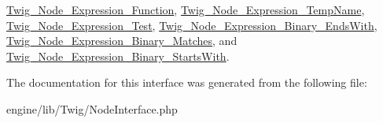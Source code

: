 \hyperlink{class_twig___node___expression___function_a4e0faa87c3fae583620b84d3607085da}{Twig\+\_\+\+Node\+\_\+\+Expression\+\_\+\+Function}, \hyperlink{class_twig___node___expression___temp_name_a4e0faa87c3fae583620b84d3607085da}{Twig\+\_\+\+Node\+\_\+\+Expression\+\_\+\+Temp\+Name}, \hyperlink{class_twig___node___expression___test_a4e0faa87c3fae583620b84d3607085da}{Twig\+\_\+\+Node\+\_\+\+Expression\+\_\+\+Test}, \hyperlink{class_twig___node___expression___binary___ends_with_a4e0faa87c3fae583620b84d3607085da}{Twig\+\_\+\+Node\+\_\+\+Expression\+\_\+\+Binary\+\_\+\+Ends\+With}, \hyperlink{class_twig___node___expression___binary___matches_a4e0faa87c3fae583620b84d3607085da}{Twig\+\_\+\+Node\+\_\+\+Expression\+\_\+\+Binary\+\_\+\+Matches}, and \hyperlink{class_twig___node___expression___binary___starts_with_a4e0faa87c3fae583620b84d3607085da}{Twig\+\_\+\+Node\+\_\+\+Expression\+\_\+\+Binary\+\_\+\+Starts\+With}.



The documentation for this interface was generated from the following file\+:\begin{DoxyCompactItemize}
\item 
engine/lib/\+Twig/Node\+Interface.\+php\end{DoxyCompactItemize}
